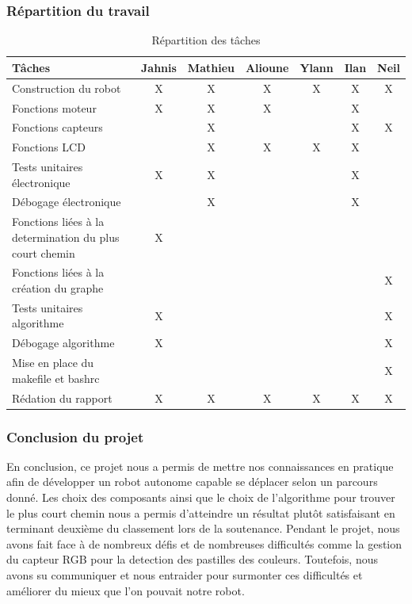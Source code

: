 \documentclass[11pt,a4paper]{article}
\begin{document}
\subsubsection{Répartition du travail}

\begin{table}[H]
\centering
\renewcommand{\arraystretch}{1.5}
\small
\begin{tabularx}{\textwidth}{|X|c|c|c|c|c|c|}
\hline
\textbf{Tâches} & \textbf{Jahnis} & \textbf{Mathieu} & \textbf{Alioune} & \textbf{Ylann} & \textbf{Ilan} & \textbf{Neil}\\ \hline
Construction du robot & X & X & X & X & X & X \\ \hline
Fonctions moteur & X & X & X &  & X &  \\ \hline
Fonctions capteurs &  & X &  &  & X & X \\ \hline
Fonctions LCD &  & X & X & X & X &  \\ \hline
Tests unitaires électronique & X & X &  &  & X &  \\ \hline
Débogage électronique &  & X &  &  & X & \\ \hline
Fonctions liées à la determination du plus court chemin & X &  &  &  &  &  \\ \hline
Fonctions liées à la création du graphe &  &  &  &  &  & X \\ \hline
Tests unitaires algorithme & X &  &  &  &  & X \\ \hline
Débogage algorithme & X &  &  &  &  & X \\ \hline
Mise en place du makefile et bashrc &  &  &  &  &  & X \\ \hline
Rédation du rapport & X & X & X & X & X & X \\ \hline
\end{tabularx}
\caption{Répartition des tâches}
\end{table}

\subsubsection{Conclusion du projet}

En conclusion, ce projet nous a permis de mettre nos connaissances en pratique afin de développer un robot autonome capable se déplacer selon un parcours donné.
Les choix des composants ainsi que le choix de l'algorithme pour trouver le plus court chemin nous a permis d'atteindre un résultat plutôt satisfaisant en terminant deuxième du classement lors de la soutenance.
Pendant le projet, nous avons fait face à de nombreux défis et de nombreuses difficultés comme la gestion du capteur RGB pour la detection des pastilles des couleurs.
Toutefois, nous avons su communiquer et nous entraider pour surmonter ces difficultés et améliorer du mieux que l'on pouvait notre robot.
\end{document}
